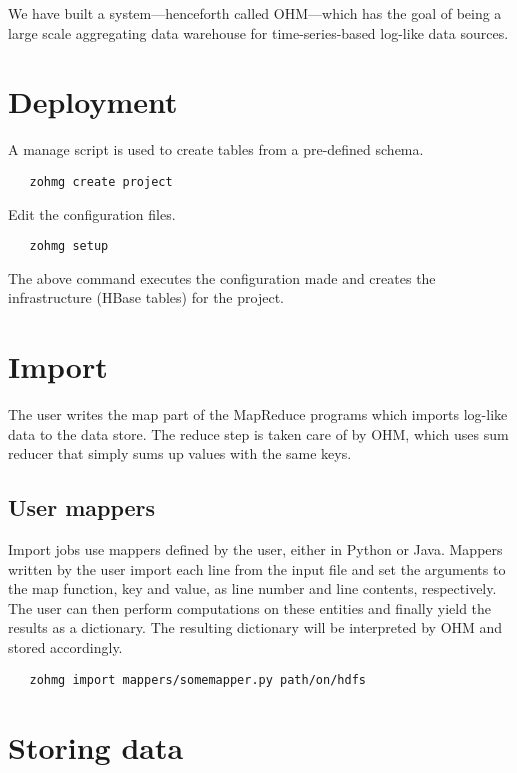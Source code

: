 \documentclass[a4paper,10pt]{book}
\begin{document}
We have built a system---henceforth called OHM---which has the goal of being
a large scale aggregating data warehouse for time-series-based log-like
data sources.



\section{Deployment}

A manage script is used to create tables from a pre-defined schema.

\begin{verbatim}
   zohmg create project
\end{verbatim}

\noindent Edit the configuration files.

\begin{verbatim}
   zohmg setup
\end{verbatim}

\noindent The above command executes the configuration made and creates the
infrastructure (HBase tables) for the project.


\section{Import}

The user writes the map part of the MapReduce programs which imports
log-like data to the data store. The reduce step is taken care of by OHM,
which uses sum reducer that simply sums up values with the same keys.


\subsection{User mappers}

Import jobs use mappers defined by the user, either in Python or Java.
Mappers written by the user import each line from the input file and set
the arguments to the map function, key and value, as line number and line
contents, respectively. The user can then perform computations on these
entities and finally yield the results as a dictionary. The resulting
dictionary will be interpreted by OHM and stored accordingly.

\begin{verbatim}
   zohmg import mappers/somemapper.py path/on/hdfs
\end{verbatim}


\section{Storing data}
\end{document}
